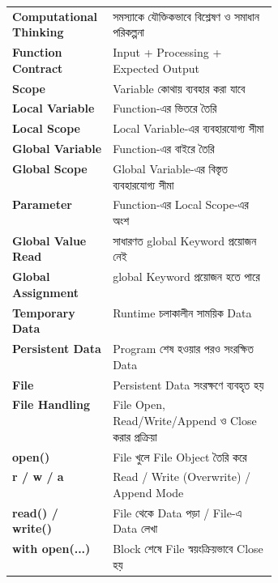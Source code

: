 \begin{rememberbox}

\begin{tabularx}
{\linewidth}
{
>{\bfseries\RaggedRight\arraybackslash}p{0.38\linewidth}
Y
}

Computational Thinking
&
সমস্যাকে যৌক্তিকভাবে বিশ্লেষণ ও সমাধান পরিকল্পনা
\\[0.45mm]

Function Contract
&
Input + Processing + Expected Output
\\[0.45mm]

Scope
&
Variable কোথায় ব্যবহার করা যাবে
\\[0.45mm]

Local Variable
&
Function-এর ভিতরে তৈরি
\\[0.45mm]

Local Scope
&
Local Variable-এর ব্যবহারযোগ্য সীমা
\\[0.45mm]

Global Variable
&
Function-এর বাইরে তৈরি
\\[0.45mm]

Global Scope
&
Global Variable-এর বিস্তৃত ব্যবহারযোগ্য সীমা
\\[0.45mm]

Parameter
&
Function-এর Local Scope-এর অংশ
\\[0.45mm]

Global Value Read
&
সাধারণত
\textenglish{\ttfamily global}
Keyword প্রয়োজন নেই
\\[0.45mm]

Global Assignment
&
\textenglish{\ttfamily global}
Keyword প্রয়োজন হতে পারে
\\[0.45mm]

Temporary Data
&
Runtime চলাকালীন সাময়িক Data
\\[0.45mm]

Persistent Data
&
Program শেষ হওয়ার পরও সংরক্ষিত Data
\\[0.45mm]

File
&
Persistent Data সংরক্ষণে ব্যবহৃত হয়
\\[0.45mm]

File Handling
&
File Open, Read/Write/Append ও Close করার প্রক্রিয়া
\\[0.45mm]

\textenglish{\ttfamily open()}
&
File খুলে File Object তৈরি করে
\\[0.45mm]

\textenglish{\ttfamily r / w / a}
&
Read / Write (Overwrite) / Append Mode
\\[0.45mm]

\textenglish{\ttfamily read() / write()}
&
File থেকে Data পড়া / File-এ Data লেখা
\\[0.45mm]

\textenglish{\ttfamily with open(...)}
&
Block শেষে File স্বয়ংক্রিয়ভাবে Close হয়
\\

\end{tabularx}

\end{rememberbox}

